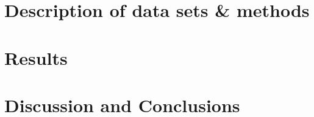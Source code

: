 
\section{Description of data sets \& methods}
\label{sec:data}


\section{Results}
\label{sec:results}


\section{Discussion and Conclusions}
\label{sec:conclusion}
